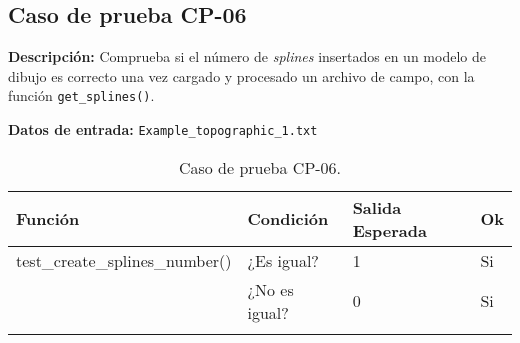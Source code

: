 \subsection{Caso de prueba CP-06}

\textbf{Descripción:} Comprueba si el número de \emph{splines} insertados en un modelo de dibujo es correcto una vez cargado y procesado un archivo de campo, con la función \texttt{get\_splines()}.

\textbf{Datos de entrada:} \texttt{Example\_topographic\_1.txt}


\begin{longtable}[]{@{}llll@{}}
\toprule
\begin{minipage}[b]{0.6\columnwidth}\raggedright\strut
Función\strut
\end{minipage} & \begin{minipage}[b]{0.20\columnwidth}\raggedright\strut
Condición\strut
\end{minipage} & \begin{minipage}[b]{0.15\columnwidth}\raggedright\strut
Salida Esperada\strut
\end{minipage} & \begin{minipage}[b]{0.05\columnwidth}\raggedright\strut
Ok\strut
\end{minipage}\tabularnewline
\midrule
\endhead
\begin{minipage}[t]{0.6\columnwidth}\raggedright\strut
test\_create\_splines\_number()\strut
\end{minipage} & \begin{minipage}[t]{0.20\columnwidth}\raggedright\strut
¿Es igual?\strut
\end{minipage} & \begin{minipage}[t]{0.15\columnwidth}\raggedright\strut
1\strut
\end{minipage} & \begin{minipage}[t]{0.05\columnwidth}\raggedright\strut
Si\strut
\end{minipage}\tabularnewline
\begin{minipage}[t]{0.6\columnwidth}\raggedright\strut
\strut
\end{minipage} & \begin{minipage}[t]{0.20\columnwidth}\raggedright\strut
¿No es igual?\strut
\end{minipage} & \begin{minipage}[t]{0.15\columnwidth}\raggedright\strut
0\strut
\end{minipage} & \begin{minipage}[t]{0.05\columnwidth}\raggedright\strut
Si\strut
\end{minipage}\tabularnewline

\bottomrule
\caption{Caso de prueba CP-06.}
\end{longtable}

